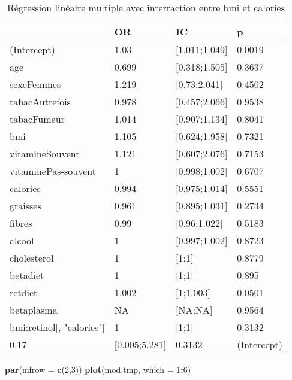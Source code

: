 \documentclass[]{article}
\newenvironment{Shaded}{\begin{snugshade}}{\end{snugshade}}
\newcommand{\KeywordTok}[1]{\textcolor[rgb]{0.13,0.29,0.53}{\textbf{#1}}}
\newcommand{\DataTypeTok}[1]{\textcolor[rgb]{0.13,0.29,0.53}{#1}}
\newcommand{\DecValTok}[1]{\textcolor[rgb]{0.00,0.00,0.81}{#1}}
\newcommand{\OperatorTok}[1]{\textcolor[rgb]{0.81,0.36,0.00}{\textbf{#1}}}
\newcommand{\NormalTok}[1]{#1}
\begin{document}
\begin{table}

\caption{\label{tab:unnamed-chunk-86}Régression linéaire multiple avec interraction entre bmi et calories}
\centering
\begin{tabular}[t]{l|l|l|l}
\hline
  & OR & IC & p\\
\hline
\rowcolor[HTML]{BBD2E1}  (Intercept) & 1.03 & [1.011;1.049] & 0.0019\\
\hline
age & 0.699 & [0.318;1.505] & 0.3637\\
\hline
\rowcolor[HTML]{BBD2E1}  sexeFemmes & 1.219 & [0.73;2.041] & 0.4502\\
\hline
tabacAutrefois & 0.978 & [0.457;2.066] & 0.9538\\
\hline
\rowcolor[HTML]{BBD2E1}  tabacFumeur & 1.014 & [0.907;1.134] & 0.8041\\
\hline
bmi & 1.105 & [0.624;1.958] & 0.7321\\
\hline
\rowcolor[HTML]{BBD2E1}  vitamineSouvent & 1.121 & [0.607;2.076] & 0.7153\\
\hline
vitaminePas-souvent & 1 & [0.998;1.002] & 0.6707\\
\hline
\rowcolor[HTML]{BBD2E1}  calories & 0.994 & [0.975;1.014] & 0.5551\\
\hline
graisses & 0.961 & [0.895;1.031] & 0.2734\\
\hline
\rowcolor[HTML]{BBD2E1}  fibres & 0.99 & [0.96;1.022] & 0.5183\\
\hline
alcool & 1 & [0.997;1.002] & 0.8723\\
\hline
\rowcolor[HTML]{BBD2E1}  cholesterol & 1 & [1;1] & 0.8779\\
\hline
betadiet & 1 & [1;1] & 0.895\\
\hline
\rowcolor[HTML]{BBD2E1}  retdiet & 1.002 & [1;1.003] & 0.0501\\
\hline
betaplasma & NA & [NA;NA] & 0.9564\\
\hline
\rowcolor[HTML]{BBD2E1}  bmi:retinol[, "calories"] & 1 & [1;1] & 0.3132\\
\hline
0.17 & [0.005;5.281] & 0.3132 & (Intercept)\\
\hline
\end{tabular}
\end{table}

\begin{Shaded}
\begin{Highlighting}[]
\KeywordTok{par}\NormalTok{(}\DataTypeTok{mfrow =} \KeywordTok{c}\NormalTok{(}\DecValTok{2}\NormalTok{,}\DecValTok{3}\NormalTok{))}
\KeywordTok{plot}\NormalTok{(mod.tmp, }\DataTypeTok{which =} \DecValTok{1}\OperatorTok{:}\DecValTok{6}\NormalTok{)}
\end{Highlighting}
\end{Shaded}
\end{document}
